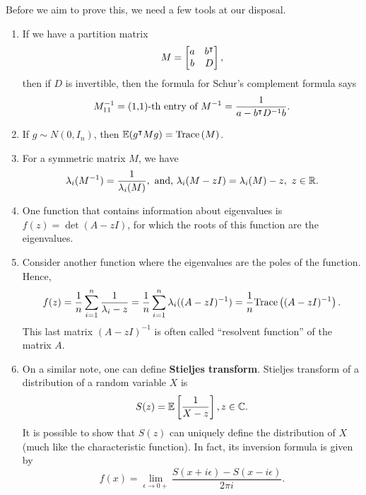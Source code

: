 \documentclass[12pt]{article}
\begin{document}
Before we aim to prove this, we need a few tools at our disposal.

\begin{enumerate}
    \item If we have a partition matrix 
    \begin{equation*}
        M = \begin{bmatrix}
            a & b^{\intercal} \\
            b & D
        \end{bmatrix},
    \end{equation*}
    \noindent then if $D$ is invertible, then the formula for Schur's complement formula says
    \begin{equation*}
        M_{11}^{-1} = \text{(1,1)-th entry of } M^{-1} = \dfrac{1}{a - b^{\intercal} D^{-1}b}.
    \end{equation*}
    \item If $g \sim N(0, I_n)$, then $\mathbb{E}(g^{\intercal} M g) = \text{\normalfont Trace}\left( M \right)$.
    \item For a symmetric matrix $M$, we have 
    \begin{equation*}
        \lambda_i(M^{-1}) = \dfrac{1}{\lambda_i(M)}, \text{ and, } 
        \lambda_i(M - zI) = \lambda_i(M) - z, \ z \in \mathbb{R}.
    \end{equation*}
    \item One function that contains information about eigenvalues is $f(z) = \det(A - zI)$, for which the roots of this function are the eigenvalues.
    \item Consider another function where the eigenvalues are the poles of the function. Hence,
    \begin{equation*}
        f(z) = \dfrac{1}{n}\sum_{i=1}^n \dfrac{1}{\lambda_i - z} = \dfrac{1}{n}\sum_{i=1}^n \lambda_i( (A-zI)^{-1} ) = \dfrac{1}{n}\text{\normalfont Trace}\left( (A - zI)^{-1} \right).
    \end{equation*}
    \noindent This last matrix $(A - zI)^{-1}$ is often called ``resolvent function'' of the matrix $A$.
    \item On a similar note, one can define \textbf{Stieljes transform}. Stieljes transform of a distribution of a random variable $X$ is 
    \begin{equation*}
        S(z) = \mathbb{E}\left[ \dfrac{1}{X - z} \right], z \in \mathbb{C}.
    \end{equation*}
    \noindent It is possible to show that $S(z)$ can uniquely define the distribution of $X$ (much like the characteristic function). In fact, its inversion formula is given by
    \begin{equation*}
        f(x) = \lim_{\epsilon \rightarrow 0+} \dfrac{S(x+i\epsilon) - S(x-i\epsilon)}{2\pi i}.
    \end{equation*}
\end{enumerate}
\end{document}

